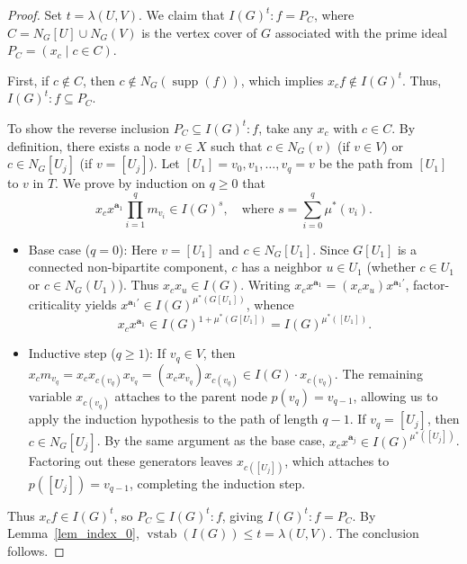 \documentclass[10pt,a4paper]{amsart}
\begin{document}
\begin{proof}
Set $t = \lambda(U,V)$. We claim that $I(G)^t : f = P_C$, where $C = N_G[U] \cup N_G(V)$ is the vertex cover of $G$ associated with the prime ideal $P_C = (x_c \mid c \in C)$. 

First, if $c \notin C$, then $c \notin N_G(\operatorname{supp}(f))$, which implies $x_c f \notin I(G)^t$. Thus, $I(G)^t : f \subseteq P_C$. 

To show the reverse inclusion $P_C \subseteq I(G)^t : f$, take any $x_c$ with $c \in C$. By definition, there exists a node $v \in X$ such that $c \in N_G(v)$ (if $v \in V$) or $c \in N_G[U_j]$ (if $v = [U_j]$). Let $[U_1] = v_0, v_1, \ldots, v_q = v$ be the path from $[U_1]$ to $v$ in $T$. We prove by induction on $q \ge 0$ that 
\[
x_c x^{\mathbf{a}_1} \prod_{i=1}^q m_{v_i} \in I(G)^s, \quad \text{where } s = \sum_{i=0}^q \mu^*(v_i).
\]
\begin{itemize}
    \item Base case ($q = 0$): Here $v = [U_1]$ and $c \in N_G[U_1]$. Since $G[U_1]$ is a connected non-bipartite component, $c$ has a neighbor $u \in U_1$ (whether $c \in U_1$ or $c \in N_G(U_1)$). Thus $x_c x_u \in I(G)$. Writing $x_c x^{\mathbf{a}_1} = (x_c x_u) x^{\mathbf{a}_1'}$, factor-criticality yields $x^{\mathbf{a}_1'} \in I(G)^{\mu^*(G[U_1])}$, whence
    \[
    x_c x^{\mathbf{a}_1} \in I(G)^{1 + \mu^*(G[U_1])} = I(G)^{\mu^*([U_1])}.
    \]

    \item Inductive step ($q \ge 1$): If $v_q \in V$, then $x_c m_{v_q} = x_c x_{c(v_q)} x_{v_q} = (x_c x_{v_q}) x_{c(v_q)} \in I(G) \cdot x_{c(v_q)}$. The remaining variable $x_{c(v_q)}$ attaches to the parent node $p(v_q) = v_{q-1}$, allowing us to apply the induction hypothesis to the path of length $q - 1$. If $v_q = [U_j]$, then $c \in N_G[U_j]$. By the same argument as the base case, $x_c x^{\mathbf{a}_j} \in I(G)^{\mu^*([U_j])}$. Factoring out these generators leaves $x_{c([U_j])}$, which attaches to $p([U_j]) = v_{q-1}$, completing the induction step.
\end{itemize}
Thus $x_c f \in I(G)^t$, so $P_C \subseteq I(G)^t : f$, giving $I(G)^t : f = P_C$. By Lemma~\ref{lem_index_0}, $\operatorname{vstab}(I(G)) \le t = \lambda(U,V)$. The conclusion follows.
\end{proof}
\end{document}
